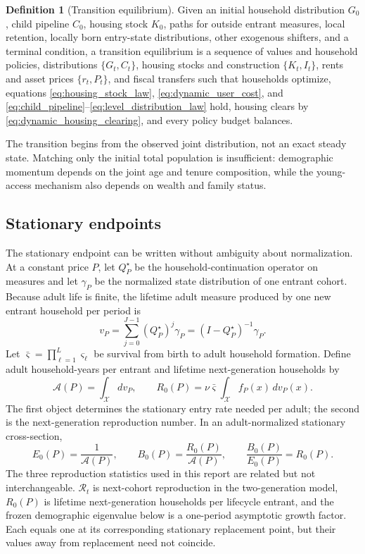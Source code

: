 \documentclass[11pt]{article}
\theoremstyle{definition}
\newtheorem{definition}{Definition}
\newcommand{\1}{\mathbf 1}
\newcommand{\X}{\mathcal X}
\begin{document}
\begin{definition}[Transition equilibrium]
Given an initial household distribution $G_0$, child pipeline $C_0$, housing
stock $K_0$, paths for outside entrant measures, local retention, locally born
entry-state distributions, other exogenous shifters, and a terminal condition, a transition
equilibrium is a sequence of values and household policies, distributions
$\{G_t,C_t\}$, housing stocks and construction $\{K_t,I_t\}$, rents and asset
prices $\{r_t,P_t\}$, and fiscal transfers such that households optimize,
equations \eqref{eq:housing_stock_law}, \eqref{eq:dynamic_user_cost}, and
\eqref{eq:child_pipeline}--\eqref{eq:level_distribution_law} hold, housing clears by
\eqref{eq:dynamic_housing_clearing}, and every policy budget balances.
\end{definition}

The transition begins from the observed joint distribution, not an exact
steady state. Matching only the initial total population is insufficient:
demographic momentum depends on the joint age and tenure composition, while
the young-access mechanism also depends on wealth and family status.

\subsection{Stationary endpoints}

The stationary endpoint can be written without ambiguity about normalization.
At a constant price $P$, let $Q_P^\star$ be the household-continuation operator
on measures and let $\gamma_P$ be the normalized state distribution of one
entrant cohort.
Because adult life is finite, the lifetime adult measure produced by one new
entrant household per period is
\begin{equation}
 v_P=\sum_{j=0}^{J-1}(Q_P^\star)^j\gamma_P
     =(I-Q_P^\star)^{-1}\gamma_P.
 \label{eq:lifetime_measure}
\end{equation}
Let $\bar\varsigma=\prod_{\ell=1}^L\varsigma_\ell$ be survival from birth to
adult household formation. Define adult household-years per entrant and
lifetime next-generation households by
\begin{equation}
 \mathcal A(P)=\int_{\X}dv_P,
 \qquad
 R_0(P)=\nu\bar\varsigma\int_{\X}f_P(x)\,dv_P(x).
 \label{eq:renewal_objects}
\end{equation}
The first object determines the stationary entry rate needed per adult; the
second is the next-generation reproduction number. In an adult-normalized
stationary cross-section,
\begin{equation}
 E_0(P)=\frac{1}{\mathcal A(P)},
 \qquad
 B_0(P)=\frac{R_0(P)}{\mathcal A(P)},
 \qquad
 \boxed{\frac{B_0(P)}{E_0(P)}=R_0(P)}.
 \label{eq:BE_bridge}
\end{equation}
The three reproduction statistics used in this report are related but not
interchangeable. $\mathcal R_t$ is next-cohort reproduction in the
two-generation model, $R_0(P)$ is lifetime next-generation households per
lifecycle entrant, and the frozen demographic eigenvalue below is a one-period
asymptotic growth factor. Each equals one at its corresponding stationary
replacement point, but their values away from replacement need not coincide.
\end{document}
